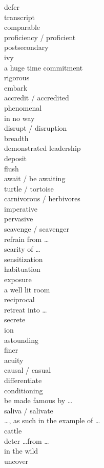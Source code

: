 \documentclass[12pt]{article}
\begin{document}
defer \\
transcript \\
comparable \\
proficiency / proficient \\
postsecondary \\
ivy \\
a huge time commitment \\
rigorous \\
embark \\
accredit / accredited \\
phenomenal \\
in no way \\
disrupt / disruption \\
breadth \\
demonstrated leadership \\
deposit \\
flush \\
await / be awaiting \\
turtle / tortoise \\
carnivorous / herbivores \\
imperative \\
pervasive \\
scavenge / scavenger \\
refrain from \dots \\
scarity of \dots \\
sensitization \\
habituation \\
exposure \\
a well lit room \\
reciprocal \\
retreat into \dots \\
secrete \\
ion \\
astounding \\
finer \\
acuity \\
causal / casual \\
differentiate \\
conditioning \\
be made famous by \dots \\
saliva / salivate \\
\dots, as such in the example of \dots \\
cattle \\
deter \dots from \dots \\
in the wild \\
uncover \\
\end{document}
